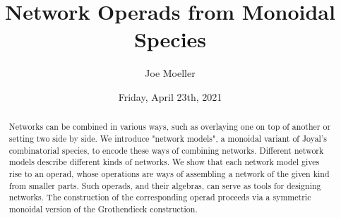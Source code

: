 \documentclass{UAmathtalk}
\author{Joe Moeller}
\title{Network Operads from Monoidal Species}
\date{Friday, April 23th, 2021}
\begin{document}
\maketitle

\begin{abstract}
Networks can be combined in various ways, such as overlaying one on top of another or setting two side by side. We introduce "network models", a monoidal variant of Joyal's combinatorial species, to encode these ways of combining networks. Different network models describe different kinds of networks. We show that each network model gives rise to an operad, whose operations are ways of assembling a network of the given kind from smaller parts. Such operads, and their algebras, can serve as tools for designing networks. The construction of the corresponding operad proceeds via a symmetric monoidal version of the Grothendieck construction.
\end{abstract}
\end{document}

